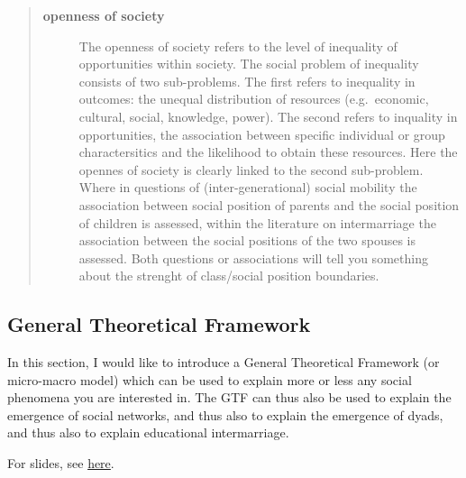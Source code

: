 \documentclass[
]{book}
\begin{document}
\begin{quote}
\begin{description}
\item[\textbf{openness of society}]
The openness of society refers to the level of inequality of opportunities within society. The social problem of inequality consists of two sub-problems. The first refers to inequality in outcomes: the unequal distribution of resources (e.g.~economic, cultural, social, knowledge, power). The second refers to inquality in opportunities, the association between specific individual or group charactersitics and the likelihood to obtain these resources. Here the opennes of society is clearly linked to the second sub-problem. Where in questions of (inter-generational) social mobility the association between social position of parents and the social position of children is assessed, within the literature on intermarriage the association between the social positions of the two spouses is assessed. Both questions or associations will tell you something about the strenght of class/social position boundaries.
\end{description}
\end{quote}

\hypertarget{general-theoretical-framework}{%
\subsection{General Theoretical Framework}\label{general-theoretical-framework}}

In this section, I would like to introduce a General Theoretical Framework (or micro-macro model) which can be used to explain more or less any social phenomena you are interested in. The GTF can thus also be used to explain the emergence of social networks, and thus also to explain the emergence of dyads, and thus also to explain educational intermarriage.

For slides, see \href{multilevel-framework.pdf}{here}.
\end{document}
